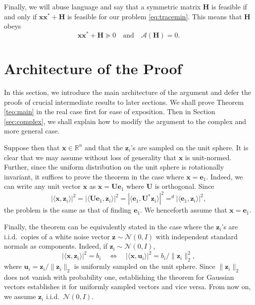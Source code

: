 \documentclass[11pt]{article}
\newcommand{\R}{\mathbb{R}}
\newcommand{\<}{\langle}
\renewcommand{\>}{\rangle}
\newcommand{\bx}{\bm{x}}
\newcommand{\bH}{\bm{H}}
\newcommand{\bU}{\bm{U}}
\newcommand{\bu}{\bm{u}}
\newcommand{\be}{\bm{e}}
\newcommand{\bz}{\bm{z}}
\numberwithin{equation}{section}
\newcommand{\cA}{\mathcal{A}}
\begin{document}
Finally, we will abuse language and say that a symmetric matrix $\bH$
is feasible if and only if $\bx\bx^* + \bH$ is feasible for our
problem \eqref{eq:tracemin}. This means that $\bH$ obeys
\begin{equation}
\label{eq:feasible}
\bx\bx^* + \bH \succeq 0 \quad \text{and} \quad \cA(\bH) = 0. 
\end{equation}








\section{Architecture of the Proof}
\label{sec:proof}

In this section, we introduce the main architecture of the argument
and defer the proofs of crucial intermediate results to later
sections. 
We shall prove Theorem \ref{teo:main} in the real case
first for ease of exposition. Then in Section \ref{sec:complex}, we
shall explain how to modify the argument to the complex and more
general case.

Suppose then that $\bx \in \R^n$ and that the $\bz_i$'s are sampled on
the unit sphere.  It is clear that we may assume without loss of
generality that $\bx$ is unit-normed. Further, since the uniform
distribution on the unit sphere is rotationally invariant, it suffices
to prove the theorem in the case where $\bx = \be_1$. Indeed, we can
write any unit vector $\bx$ as $\bx = \bU \be_1$ where $\bU$ is
orthogonal. Since
\[
|\<\bx, \bz_i\>|^2 = |\<\bU\be_1, \bz_i\>|^2 = |\<\be_1, \bU^* \bz_i\>|^2 =^d
|\<\be_1, \bz_i\>|^2,
\]
the problem is the same as that of finding $\be_1$. We henceforth
assume that $\bx = \be_1$.

Finally, the theorem can be equivalently stated in the case where the
$\bz_i$'s are i.i.d.~copies of a white noise vector $\bz \sim \mathcal{N}(0,I)$
with independent standard normals as components. Indeed, if $\bz_i \sim
\mathcal{N}(0,I)$, 
\[
|\<\bx, \bz_i\>|^2 = b_i \quad \Longleftrightarrow \quad |\<\bx, \bu_i\>|^2 =
b_i/\|\bz_i\|_2^2,
\]
where $\bu_i = \bz_i/\|\bz_i\|_2$ is uniformly sampled on the unit
sphere. Since $\|\bz_i\|_2$ does not vanish with probability one,
establishing the theorem for Gaussian vectors establishes it for
uniformly sampled vectors and vice versa. From now on, we assume $\bz_i$
i.i.d.\ $\mathcal{N}(0,I)$.
\end{document}

